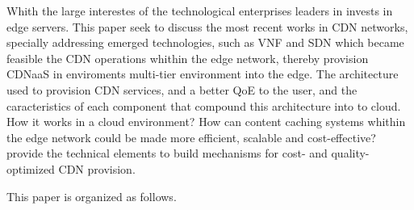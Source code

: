 Whith the large interestes of the technological enterprises leaders in invests in edge servers.
This paper seek to discuss the most recent works in CDN networks, specially addressing emerged technologies, such as VNF and SDN which became feasible the CDN operations whithin the edge network, thereby provision CDNaaS in enviroments multi-tier environment into the edge. The architecture used to provision CDN services, and a better QoE to the user, and the caracteristics of each component that compound this architecture into to cloud. How it works in a cloud environment? How can content caching systems whithin the edge network could be made more efficient, scalable and cost-effective?
provide the technical elements to build mechanisms for cost- and quality-optimized CDN provision.


This paper is organized as follows. 


%

